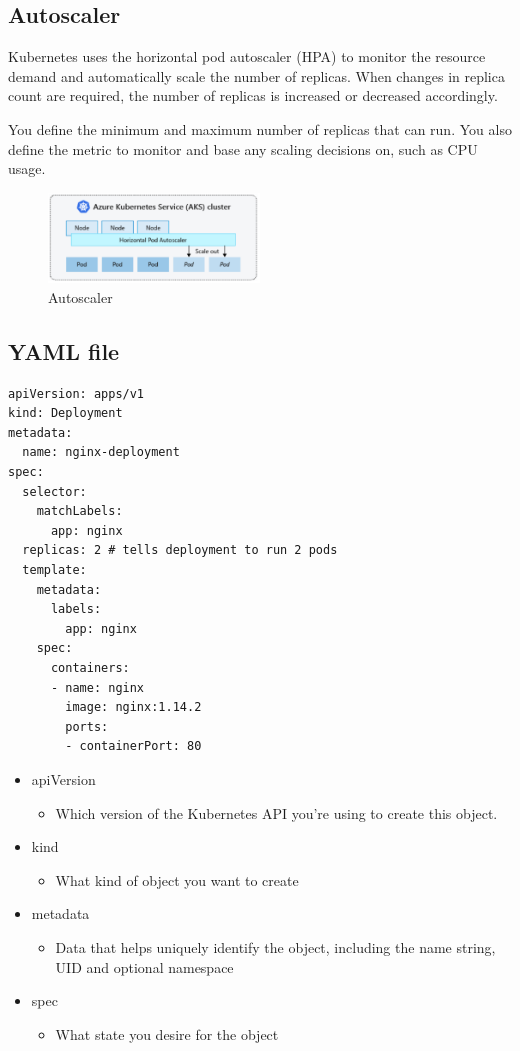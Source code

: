 \documentclass{article}
\begin{document}
\subsection{Autoscaler}

Kubernetes uses the horizontal pod autoscaler (HPA) to monitor the resource demand and automatically scale the number of replicas. 
When changes in replica count are required, the number of replicas is increased or decreased accordingly.

You define the minimum and maximum number of replicas that can run. 
You also define the metric to monitor and base any scaling decisions on, such as CPU usage.

\begin{figure}[H]
    \centering
    \includegraphics[width=0.5\textwidth]{img/autoscaler.png}
    \caption{Autoscaler}
\end{figure}

\subsection{YAML file}

\begin{verbatim}
apiVersion: apps/v1
kind: Deployment
metadata:
  name: nginx-deployment
spec:
  selector:
    matchLabels:
      app: nginx
  replicas: 2 # tells deployment to run 2 pods
  template:
    metadata:
      labels:
        app: nginx
    spec:
      containers:
      - name: nginx
        image: nginx:1.14.2
        ports:
        - containerPort: 80
\end{verbatim}

\begin{itemize}
    \item apiVersion
    \begin{itemize}
        \item Which version of the Kubernetes API you’re using to create this object.
    \end{itemize}
    \item kind
    \begin{itemize}
        \item What kind of object you want to create
    \end{itemize}
    \item metadata
    \begin{itemize}
        \item Data that helps uniquely identify the object, including the name string, UID and optional namespace
    \end{itemize}
    \item spec
    \begin{itemize}
        \item What state you desire for the object
    \end{itemize}
\end{itemize}
\end{document}
